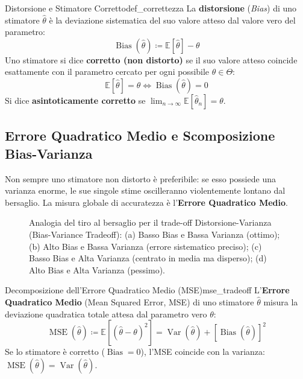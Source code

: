 \begin{definizione}{Distorsione e Stimatore Corretto}{def_correttezza}
La \textbf{distorsione} (\emph{Bias}) di uno stimatore $\widehat{\theta}$ è la deviazione sistematica del suo valore atteso dal valore vero del parametro:
\begin{equation}
    \operatorname{Bias}(\widehat{\theta}) \coloneqq \mathbb{E}[\widehat{\theta}] - \theta
\end{equation}
Uno stimatore si dice \textbf{corretto (non distorto)} se il suo valore atteso coincide esattamente con il parametro cercato per ogni possibile $\theta \in \Theta$:
\begin{equation}
    \mathbb{E}[\widehat{\theta}] = \theta \iff \operatorname{Bias}(\widehat{\theta}) = 0
\end{equation}
Si dice \textbf{asintoticamente corretto} se $\lim_{n \to \infty} \mathbb{E}[\widehat{\theta}_n] = \theta$.
\end{definizione}

\subsection{Errore Quadratico Medio e Scomposizione Bias-Varianza}

Non sempre uno stimatore non distorto è preferibile: se esso possiede una varianza enorme, le sue singole stime oscilleranno violentemente lontano dal bersaglio. La misura globale di accuratezza è l'\textbf{Errore Quadratico Medio}.

\begin{figure}[htbp]
    \centering
    
    \caption{Analogia del tiro al bersaglio per il trade-off Distorsione-Varianza (Bias-Variance Tradeoff): (a) Basso Bias e Bassa Varianza (ottimo); (b) Alto Bias e Bassa Varianza (errore sistematico preciso); (c) Basso Bias e Alta Varianza (centrato in media ma disperso); (d) Alto Bias e Alta Varianza (pessimo).}
    \label{fig:bias_variance_tradeoff}
\end{figure}

\begin{teorema}{Decomposizione dell'Errore Quadratico Medio (MSE)}{mse_tradeoff}
L'\textbf{Errore Quadratico Medio} (Mean Squared Error, MSE) di uno stimatore $\widehat{\theta}$ misura la deviazione quadratica totale attesa dal parametro vero $\theta$:
\begin{equation}
    \operatorname{MSE}(\widehat{\theta}) \coloneqq \mathbb{E}\left[(\widehat{\theta} - \theta)^2\right] = \operatorname{Var}(\widehat{\theta}) + \left[\operatorname{Bias}(\widehat{\theta})\right]^2
\end{equation}
Se lo stimatore è corretto ($\operatorname{Bias}=0$), l'MSE coincide con la varianza: $\operatorname{MSE}(\widehat{\theta}) = \operatorname{Var}(\widehat{\theta})$.
\end{teorema}

